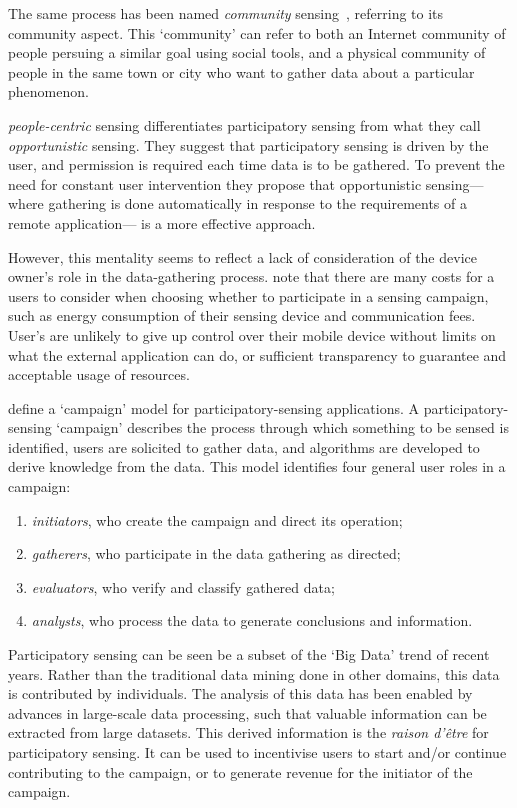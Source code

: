 The same process has been named \emph{community} sensing~\citep{Krause2008},
referring to its community aspect. This `community' can refer to both an
Internet community of people persuing a similar goal using social tools, and a
physical community of people in the same town or city who want to gather data
about a particular phenomenon.

 \emph{people-centric} sensing differentiates
participatory sensing from what they call \emph{opportunistic} sensing. They
suggest that participatory sensing is driven by the user, and permission is
required each time data is to be gathered. To prevent the need for constant
user intervention they propose that opportunistic sensing---where gathering is
done automatically in response to the requirements of a remote application---
is a more effective approach. 

However, this mentality seems to reflect a lack of consideration of the device
owner's role in the data-gathering process. \citet{BuckinghamShum2012} note
that there are many costs for a users to consider when choosing whether to
participate in a sensing campaign, such as energy consumption of their sensing
device and communication fees. User's are unlikely to give up control over
their mobile device without limits on what the external application can do, or
sufficient transparency to guarantee and acceptable usage of resources.

\citet{Burke2006} define a `campaign' model for participatory-sensing
applications. A participatory-sensing `campaign' describes the process through
which something to be sensed is identified, users are solicited to gather
data, and algorithms are developed to derive knowledge from the data. This
model identifies four general user roles in a campaign:

\begin{enumerate}
\item \emph{initiators}, who create the campaign and direct its operation;
\item \emph{gatherers}, who participate in the data gathering as directed;
\item \emph{evaluators}, who verify and classify gathered data;
\item \emph{analysts}, who process the data to generate conclusions and information.
\end{enumerate}

Participatory sensing can be seen be a subset of the `Big Data' trend of
recent years. Rather than the traditional data mining done in other domains,
this data is contributed by individuals. The analysis of this data has been
enabled by advances in large-scale data processing, such that valuable information
can be extracted from large datasets. This derived information is the
\emph{raison d'\^{e}tre} for participatory sensing. It can be used to
incentivise users to start and/or continue contributing to the campaign, or to
generate revenue for the initiator of the campaign.

